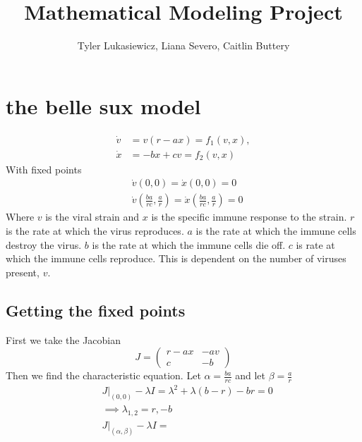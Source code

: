 \documentclass{article}
\title{Mathematical Modeling Project}
\author{Tyler Lukasiewicz, Liana Severo, Caitlin Buttery}
\begin{document}
\maketitle
\section{the belle sux model}
\begin{equation}
    \begin{split}
        \dot v &= v(r-ax) = f_1(v,x), \\
        \dot x &= -bx + cv = f_2(v,x)
    \end{split}
\end{equation}
With fixed points 
\begin{equation}
    \begin{split}
        &\dot v(0,0) =  \dot x(0,0) = 0 \\
        &\dot v(\frac{ba}{rc} ,\frac{a}{r} ) = \dot x(\frac{ba}{rc} ,\frac{a}{r} ) = 0
    \end{split}
\end{equation}
Where $v$ is the viral strain and $x$ is the specific immune response to the strain. $r$ is the rate at which the virus reproduces. $a$ is the rate at which the immune cells destroy the virus. $b$ is the rate at which the immune cells die off. $c$ is rate at which the immune cells reproduce. This is dependent on the number of viruses present, $v$.  
\subsection{Getting the fixed points}
First we take the Jacobian
\begin{equation}
    J =
    \begin{pmatrix}
        r-ax    & -av \\
        c       & -b
    \end{pmatrix}
\end{equation}
Then we find the characteristic equation. Let $\alpha = \frac{ba}{rc} $ and let $\beta = \frac{a}{r} $
\begin{equation}
    \begin{split}
        &J|_{(0,0)} - \lambda I = \lambda^2 + \lambda(b-r) -br = 0\\
        &\implies \lambda_{1,2} = r, -b \\
        &J|_{(\alpha,\beta)}  - \lambda I=  
    \end{split}
\end{equation}
\end{document}
